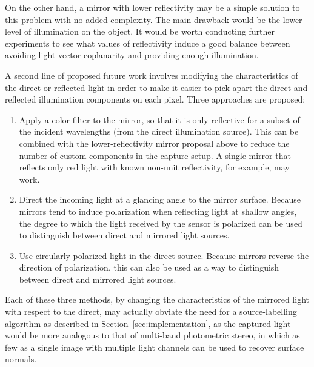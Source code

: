 On the other hand, a mirror with lower reflectivity may be a simple solution to
this problem with no added complexity. The main drawback would be the lower
level of illumination on the object. It would be worth conducting further
experiments to see what values of reflectivity induce a good balance between
avoiding light vector coplanarity and providing enough illumination.

A second line of proposed future work involves modifying the characteristics of
the direct or reflected light in order to make it easier to pick apart the
direct and reflected illumination components on each pixel. Three approaches
are proposed:
\begin{enumerate}
  \item Apply a color filter to the mirror, so that it is only reflective for a
  subset of the incident wavelengths (from the direct illumination source).
  This can be combined with the lower-reflectivity mirror proposal above to
  reduce the number of custom components in the capture setup. A single mirror
  that reflects only red light with known non-unit reflectivity, for example,
  may work.
  \item Direct the incoming light at a glancing angle to the mirror surface.
  Because mirrors tend to induce polarization when reflecting light at shallow
  angles, the degree to which the light received by the sensor is polarized can
  be used to distinguish between direct and mirrored light sources.
  \item Use circularly polarized light in the direct source. Because mirrors
  reverse the direction of polarization, this can also be used as a way to
  distinguish between direct and mirrored light sources.
\end{enumerate}
Each of these three methods, by changing the characteristics of the mirrored
light with respect to the direct, may actually obviate the need for a
source-labelling algorithm as described in Section~\ref{sec:implementation}, as
the captured light would be more analogous to that of multi-band photometric
stereo, in which as few as a single image with multiple light channels can be
used to recover surface normals.

